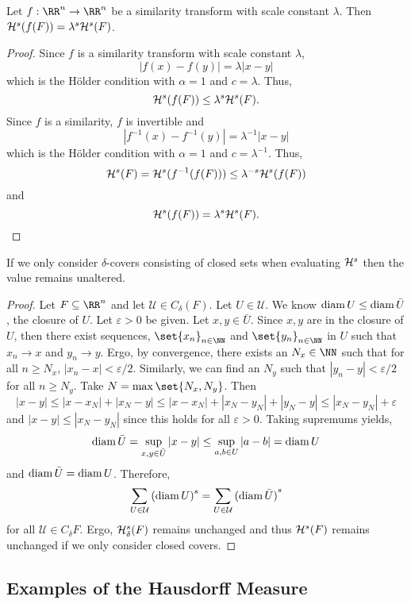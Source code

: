 \begin{thm}\label{hm-sim}
	Let $f:\RR^n\rightarrow\RR^n$ be a similarity transform with scale constant $\lambda$.
	Then $\mathcal{H}^s(f(F))=\lambda^s\mathcal{H}^s(F)$.
\end{thm}
\begin{proof}
	Since $f$ is a similarity transform with scale constant $\lambda$,
	\[
		|f(x)-f(y)|=\lambda|x-y|
	\]
	which is the H\"older condition with $\alpha=1$ and $c=\lambda$.
	Thus,
	\[
		\mathcal{H}^s(f(F))\leq \lambda^s\mathcal{H}^s(F).
	\]
	Since $f$ is a similarity, $f$ is invertible and
	\[
		|f^{-1}(x)-f^{-1}(y)|=\lambda^{-1}|x-y|
	\]
	which is the H\"older condition with $\alpha=1$ and $c=\lambda^{-1}$.
	Thus,
	\[
		\mathcal{H}^s(F)=\mathcal{H}^s(f^{-1}(f(F)))\leq\lambda^{-s}\mathcal{H}^s(f(F))
	\]
	and
	\[
		\mathcal{H}^s(f(F))=\lambda^s\mathcal{H}^s(F).
	\]
\end{proof}

\begin{proposition}
	If we only consider $\delta$-covers consisting of closed sets when evaluating $\mathcal{H}^s$ then the value remains unaltered.
\end{proposition}

\begin{proof}
	Let $F\subseteq\RR^n$ and let $\mathcal{U}\in C_\delta(F)$.
	Let $U\in\mathcal{U}$.
	We know $\operatorname{diam} U\leq\operatorname{diam} \bar{U}$, the closure of $U$.
	Let $\varepsilon > 0$ be given.
	Let $x,y\in\bar{U}$.
	Since $x,y$ are in the closure of $U$, then there exist sequences, $\set{x_n}_{n\in\NN}$ and $\set{y_n}_{n\in\NN}$ in $U$ such that $x_n\rightarrow x$ and $y_n\rightarrow y$.
	Ergo, by convergence, there exists an $N_x\in\NN$ such that for all $n\geq N_x$, $|x_n-x|<\varepsilon/2$.
	Similarly, we can find an $N_y$ such that $|y_n-y|<\varepsilon/2$ for all $n\geq N_y$.
	Take $N=\max\set{N_x,N_y}$.
	Then
	\[
		|x-y|\leq |x-x_N|+|x_N-y|\leq |x-x_N|+|x_N-y_N|+|y_N-y|\leq |x_N-y_N|+\varepsilon
	\]
	and $|x-y|\leq |x_N-y_N|$ since this holds for all $\varepsilon >0$.
	Taking supremums yields,
	\[
		\operatorname{diam} \bar{U} =\sup_{x,y\in\bar{U}} |x-y|\leq \sup_{a,b\in U} |a-b|=\operatorname{diam} U
	\]
	and $\operatorname{diam}\bar{U}=\operatorname{diam} U$.
	Therefore,
	\[
		\sum_{U\in\mathcal{U}}{(\operatorname{diam} U)}^s=\sum_{U\in\mathcal{U}}{(\operatorname{diam}\bar{U})}^s
	\]
	for all $\mathcal{U}\in C_\delta F$.
	Ergo, $\mathcal{H}^s_\delta(F)$ remains unchanged and thus $\mathcal{H}^s(F)$ remains unchanged if we only consider closed covers.
\end{proof}

\subsection{Examples of the Hausdorff Measure}

